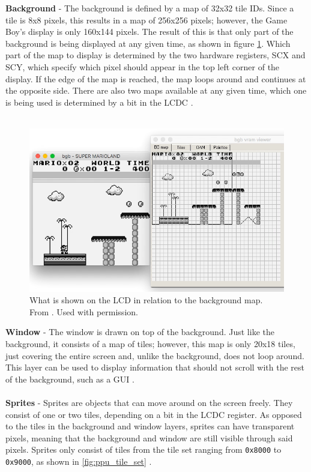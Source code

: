 \textbf{Background} - 
The background is defined by a map of 32x32 tile IDs. Since a tile is 8x8 pixels, this results in a map of 256x256 pixels; however, the Game Boy's display is only 160x144 pixels. The result of this is that only part of the background is being displayed at any given time, as shown in figure \ref{fig:ppu_viewport}. Which part of the map to display is determined by the two hardware registers, SCX and SCY, which specify which pixel should appear in the top left corner of the display. If the edge of the map is reached, the map loops around and continues at the opposite side. There are also two maps available at any given time, which one is being used is determined by a bit in the LCDC \cite{pandocsVideo}.\\
\\
\begin{figure}[H]
    \centering
    \includegraphics[width=\linewidth]{figures/PPU/PPU_viewport.png}
    \caption{What is shown on the LCD in relation to the background map. From \cite{ultimateGBtalkSlides}. Used with permission.}
    \label{fig:ppu_viewport}
\end{figure}
\textbf{Window} - 
The window is drawn on top of the background. Just like the background, it consists of a map of tiles; however, this map is only 20x18 tiles, just covering the entire screen and, unlike the background, does not loop around. This layer can be used to display information that should not scroll with the rest of the background, such as a GUI \cite{pandocsVideo}.\\
\\
\textbf{Sprites} - 
Sprites are objects that can move around on the screen freely. They consist of one or two tiles, depending on a bit in the LCDC register. As opposed to the tiles in the background and window layers, sprites can have transparent pixels, meaning that the background and window are still visible through said pixels. Sprites only consist of tiles from the tile set ranging from \texttt{0x8000} to \texttt{0x9000}, as shown in \ref{fig:ppu_tile_set} \cite{pandocsVideo}.\\
